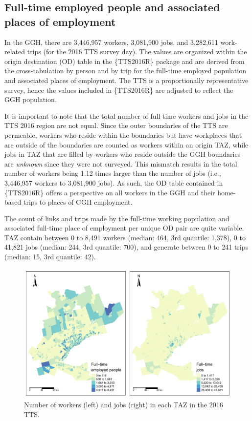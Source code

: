 \documentclass[Royal,times,sageh]{sagej}
\begin{document}
\hypertarget{full-time-employed-people-and-associated-places-of-employment}{%
\subsection{Full-time employed people and associated places of
employment}\label{full-time-employed-people-and-associated-places-of-employment}}

In the GGH, there are 3,446,957 workers, 3,081,900 jobs, and 3,282,611
work-related trips (for the 2016 TTS survey day). The values are
organized within the origin destination (OD) table in the \{TTS2016R\}
package and are derived from the cross-tabulation by person and by trip
for the full-time employed population and associated places of
employment. The TTS is a proportionally representative survey, hence the
values included in \{TTS2016R\} are adjusted to reflect the GGH
population.

It is important to note that the total number of full-time workers and
jobs in the TTS 2016 region are not equal. Since the outer boundaries of
the TTS are permeable, workers who reside within the boundaries but have
workplaces that are outside of the boundaries are counted as workers
within an origin TAZ, while jobs in TAZ that are filled by workers who
reside outside the GGH boundaries are \emph{unknown} since they were not
surveyed. This mismatch results in the total number of workers being
1.12 times larger than the number of jobs (i.e., 3,446,957 workers to
3,081,900 jobs). As such, the OD table contained in \{TTS2016R\} offers
a perspective on all workers in the GGH and their home-based trips to
places of GGH employment.

The count of links and trips made by the full-time working population
and associated full-time place of employment per unique OD pair are
quite variable. TAZ contain between 0 to 8,491 workers (median: 464, 3rd
quantile: 1,378), 0 to 41,821 jobs (median: 244, 3rd quantile: 700), and
generate between 0 to 241 trips (median: 15, 3rd quantile: 42).

\begin{figure}
\includegraphics[width=1\linewidth]{Manuscript-Data-Package_files/figure-latex/tts-workers-jobs-plot-1} \caption{\label{fig:tts-workers-jobs-plot}Number of workers (left) and jobs (right) in each TAZ in the 2016 TTS.}\label{fig:tts-workers-jobs-plot}
\end{figure}
\end{document}
